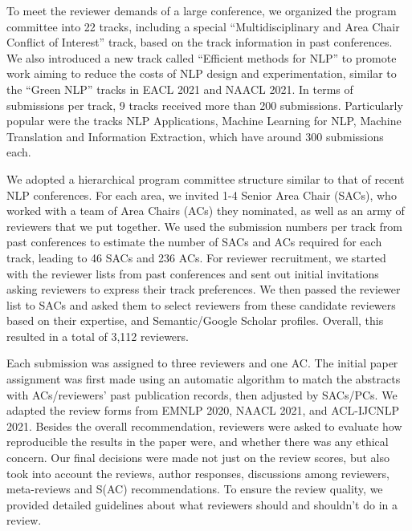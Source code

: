 To meet the reviewer demands of a large conference, we organized the program committee into 22 tracks, including a special ``Multidisciplinary and Area Chair Conflict of Interest'' track, based on the track information in past conferences. We also introduced a new track called ``Efficient methods for NLP'' to promote work aiming to reduce the costs of NLP design and experimentation, similar to the ``Green NLP'' tracks in EACL 2021 and NAACL 2021. In terms of submissions per track, 9 tracks received more than 200 submissions. Particularly popular were the tracks NLP Applications, Machine Learning for NLP, Machine Translation and Information Extraction, which have around 300 submissions each.

We adopted a hierarchical program committee structure similar to that of recent NLP conferences. For each area, we invited 1-4 Senior Area Chair (SACs), who worked with a team of Area Chairs (ACs) they nominated, as well as an army of reviewers that we put together. We used the submission numbers per track from past conferences to estimate the number of SACs and ACs required for each track, leading to 46 SACs and 236 ACs. For reviewer recruitment, we started with the reviewer lists from past conferences and sent out initial invitations asking reviewers to express their track preferences. We then passed the reviewer list to SACs and asked them to select reviewers from these candidate reviewers based on their expertise, and Semantic/Google Scholar profiles. Overall, this resulted in a total of 3,112 reviewers.

Each submission was assigned to three reviewers and one AC. The initial paper assignment was first made using an automatic algorithm to match the abstracts with ACs/reviewers' past publication records, then adjusted by SACs/PCs. We adapted the review forms from EMNLP 2020, NAACL 2021, and ACL-IJCNLP 2021. Besides the overall recommendation, reviewers were asked to evaluate how reproducible the results in the paper were, and whether there was any ethical concern. Our final decisions were made not just on the review scores, but also took into account the reviews, author responses, discussions among reviewers, meta-reviews and S(AC) recommendations. To ensure the review quality, we provided detailed guidelines about what reviewers should and shouldn't do in a review.

